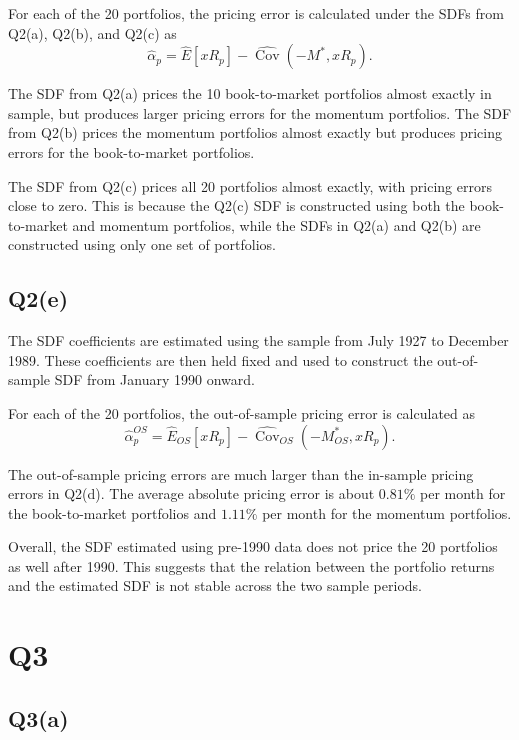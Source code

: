 \documentclass{article}
\begin{document}
For each of the 20 portfolios, the pricing error is calculated under the SDFs from Q2(a), Q2(b), and Q2(c) as
\[
\hat\alpha_p
=
\hat E[xR_p]
-
\widehat{\operatorname{Cov}}(-M^*,xR_p).
\]



The SDF from Q2(a) prices the 10 book-to-market portfolios almost exactly in sample, but produces larger pricing errors for the momentum portfolios. The SDF from Q2(b) prices the momentum portfolios almost exactly but produces pricing errors for the book-to-market portfolios.

The SDF from Q2(c) prices all 20 portfolios almost exactly, with pricing errors close to zero. This is because the Q2(c) SDF is constructed using both the book-to-market and momentum portfolios, while the SDFs in Q2(a) and Q2(b) are constructed using only one set of portfolios.

\subsection{Q2(e)}

The SDF coefficients are estimated using the sample from July 1927 to December 1989. These coefficients are then held fixed and used to construct the out-of-sample SDF from January 1990 onward. 

For each of the 20 portfolios, the out-of-sample pricing error is calculated as
\[
\hat\alpha_p^{OS}
=
\hat E_{OS}[xR_p]
-
\widehat{\operatorname{Cov}}_{OS}(-M^{*}_{OS},xR_p).
\]



The out-of-sample pricing errors are much larger than the in-sample pricing errors in Q2(d). The average absolute pricing error is about \(0.81\%\) per month for the book-to-market portfolios and \(1.11\%\) per month for the momentum portfolios.

Overall, the SDF estimated using pre-1990 data does not price the 20 portfolios as well after 1990. This suggests that the relation between the portfolio returns and the estimated SDF is not stable across the two sample periods.

\newpage


\section{Q3}


\subsection{Q3(a)}
\end{document}
